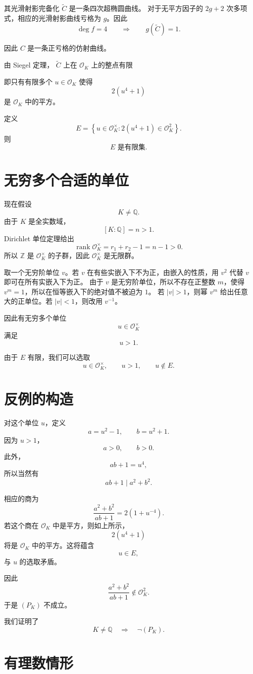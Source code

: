 \documentclass[11pt,a4paper]{article}
\newcommand{\OK}{\mathcal O_K}
\newcommand{\Q}{\mathbb Q}
\begin{document}
其光滑射影完备化 \(\widetilde C\) 是一条四次超椭圆曲线。
对于无平方因子的 \(2g+2\) 次多项式，相应的光滑射影曲线亏格为 \(g\)。因此
\[
\deg f=4
\qquad\Longrightarrow\qquad
g(\widetilde C)=1.
\]

因此 \(C\) 是一条正亏格的仿射曲线。

由 Siegel 定理， \(\widetilde C\) 上在 \(\OK\) 上的整点有限

即只有有限多个 \(u\in\OK\) 使得
\[
2(u^4+1)
\]
是 \(\OK\) 中的平方。

定义
\[
E=
\left\{
u\in\OK^\times:
2(u^4+1)\in\OK^2
\right\}.
\]
则
\[
E\text{ 是有限集}.
\]

\section{无穷多个合适的单位}

现在假设
\[
K\neq\Q.
\]
由于 \(K\) 是全实数域，
\[
[K:\Q]=n>1.
\]
Dirichlet 单位定理给出
\[
\operatorname{rank}\OK^\times=r_1+r_2-1=n-1>0.
\]
所以 \(\mathbb Z\) 是 \(\OK^\times\) 的子群，因此 \(\OK^\times\) 是无限群。

取一个无穷阶单位 \(v\)。若 \(v\) 在有些实嵌入下不为正，由嵌入的性质，用 \(v^2\) 代替 \(v\) 即可在所有实嵌入下为正。
由于 \(v\) 是无穷阶单位，所以不存在正整数 \(m\)，使得 \(v^m=1\)，所以在恒等嵌入下的绝对值不被迫为 \(1\)。
若 \(|v|>1\)，则幂 \(v^m\) 给出任意大的正单位。若 \(|v|<1\)，则改用 \(v^{-1}\)。

因此有无穷多个单位
\[
u\in\OK^\times
\]
满足
\[
u>1.
\]

由于 \(E\) 有限，我们可以选取
\[
u\in\OK^\times,\qquad
u>1,\qquad
u\notin E.
\]

\section{反例的构造}

对这个单位 \(u\)，定义
\[
a=u^2-1,\qquad b=u^2+1.
\]
因为 \(u>1\)，
\[
a>0,\qquad b>0.
\]
此外，
\[
ab+1=u^4,
\]
所以当然有
\[
ab+1\mid a^2+b^2.
\]

相应的商为
\[
\frac{a^2+b^2}{ab+1}
=
2(1+u^{-4}).
\]
若这个商在 \(\OK\) 中是平方，则如上所示，
\[
2(u^4+1)
\]
将是 \(\OK\) 中的平方。这将蕴含
\[
u\in E,
\]
与 \(u\) 的选取矛盾。

因此
\[
\frac{a^2+b^2}{ab+1}\notin\OK^2.
\]
于是 \((P_K)\) 不成立。

我们证明了
\[
K\neq\Q
\quad\Longrightarrow\quad
\neg(P_K).
\]

\section{有理数情形}
\end{document}

